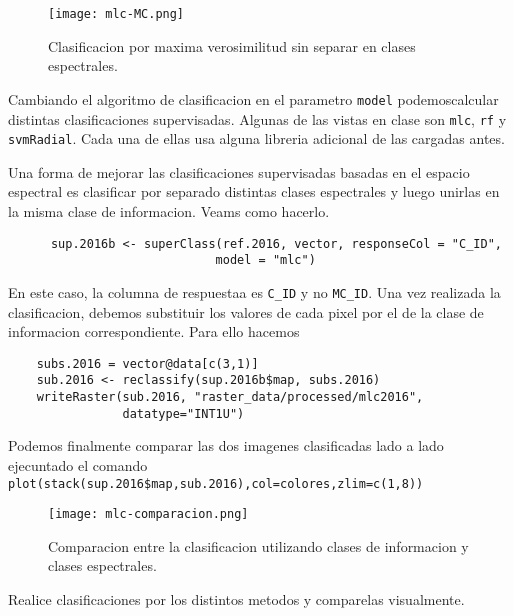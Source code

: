 \begin{figure}[h!]
  \centering
  \texttt{[image: mlc-MC.png]}
  \caption{Clasificacion por maxima verosimilitud sin separar en clases espectrales.}
  \label{fig:MC}
\end{figure}

Cambiando el algoritmo de clasificacion en el parametro \texttt{model} podemoscalcular distintas clasificaciones supervisadas. Algunas de las vistas en clase son \texttt{mlc}, \texttt{rf} y \texttt{svmRadial}. Cada una de ellas usa alguna libreria adicional de las cargadas antes.

\begin{exa}
  Una forma de mejorar las clasificaciones supervisadas basadas en el espacio espectral es clasificar por separado distintas clases espectrales y luego unirlas en la misma clase de informacion. Veams como hacerlo.

  \begin{lstlisting}
      sup.2016b <- superClass(ref.2016, vector, responseCol = "C_ID",
                             model = "mlc")
  \end{lstlisting}

  En este caso, la columna de respuestaa es \texttt{C\_ID} y no \texttt{MC\_ID}.  Una vez realizada la clasificacion, debemos substituir los valores de cada pixel por el de la clase de informacion correspondiente. Para ello hacemos

  \begin{lstlisting}
    subs.2016 = vector@data[c(3,1)]
    sub.2016 <- reclassify(sup.2016b$map, subs.2016)
    writeRaster(sub.2016, "raster_data/processed/mlc2016",
                datatype="INT1U")
  \end{lstlisting}

    Podemos finalmente comparar las dos imagenes clasificadas lado a lado ejecuntado el comando \verb|plot(stack(sup.2016$map,sub.2016),col=colores,zlim=c(1,8))|
    \begin{figure}[h!]
      \centering
      \texttt{[image: mlc-comparacion.png]}
      \caption{Comparacion entre la clasificacion utilizando clases de informacion y clases espectrales.}
      \label{fig:mlc}
    \end{figure}
\end{exa}

\begin{act}
    Realice clasificaciones por los distintos metodos y comparelas visualmente.
\end{act}


